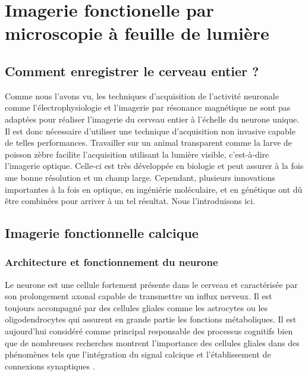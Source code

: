 \section{Imagerie fonctionelle par microscopie à feuille de lumière}

\subsection{Comment enregistrer le cerveau entier ?}

Comme nous l'avons vu, les techniques d'acquisition de l'activité neuronale comme l'électrophysiologie et l'imagerie par résonance magnétique ne sont pas adaptées pour réaliser l'imagerie du cerveau entier à l'échelle du neurone unique. Il est donc nécessaire d'utiliser une technique d'acquisition non invasive capable de telles performances. Travailler sur un animal transparent comme la larve de poisson zèbre facilite l'acquisition utilisant la lumière visible, c'est-à-dire l'imagerie optique. Celle-ci est très développée en biologie et peut assurer à la fois une bonne résolution et un champ large. Cependant, plusieurs innovations importantes à la fois en optique, en ingéniérie moléculaire, et en génétique ont dû être combinées pour arriver à un tel résultat. Nous l'introduisons ici.

\subsection{Imagerie fonctionnelle calcique}

\subsubsection{Architecture et fonctionnement du neurone}

Le neurone est une cellule fortement présente dans le cerveau et caractérisée par son prolongement axonal capable de transmettre un influx nerveux. Il est toujours accompagné par des cellules gliales comme les astrocytes ou les oligodendrocytes qui assurent en grande partie les fonctions métaboliques. Il est aujourd'hui considéré comme principal responsable des processus cognitifs bien que de nombreuses recherches montrent l'importance des cellules gliales dans des phénomènes tels que l'intégration du signal calcique et l'établissement de connexions synaptiques \cite{verkhratsky_calcium_1996} \cite{pfrieger_synaptic_1997}.

